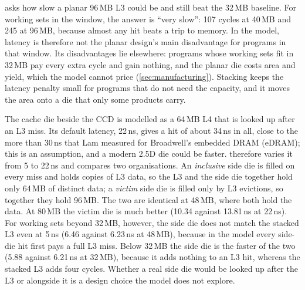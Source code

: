 

 asks how slow a planar 96\,MB L3 could be and still beat the 32\,MB baseline. For working sets in the window, the answer is ``very slow'': 107 cycles at 40\,MB and 245 at 96\,MB, because almost any hit beats a trip to memory. In the model, latency is therefore not the planar design's main disadvantage for programs in that window. Its disadvantages lie elsewhere: programs whose working sets fit in 32\,MB pay every extra cycle and gain nothing, and the planar die costs area and yield, which the model cannot price (\cref{sec:manufacturing}). Stacking keeps the latency penalty small for programs that do not need the capacity, and it moves the area onto a die that only some products carry.



The cache die beside the CCD is modelled as a 64\,MB L4 that is looked up after an L3 miss. Its default latency, 22\,ns, gives a hit of about 34\,ns in all, close to the more than 30\,ns that Lam measured for Broadwell's embedded DRAM (eDRAM); this is an assumption, and a modern 2.5D die could be faster.  therefore varies it from 5 to 22\,ns and compares two organisations. An \emph{inclusive} side die is filled on every miss and holds copies of L3 data, so the L3 and the side die together hold only 64\,MB of distinct data; a \emph{victim} side die is filled only by L3 evictions, so together they hold 96\,MB. The two are identical at 48\,MB, where both hold the data. At 80\,MB the victim die is much better (10.34 against 13.81\,ns at 22\,ns). For working sets beyond 32\,MB, however, the side die does not match the stacked L3 even at 5\,ns (6.46 against 6.23\,ns at 48\,MB), because in the model every side-die hit first pays a full L3 miss. Below 32\,MB the side die is the faster of the two (5.88 against 6.21\,ns at 32\,MB), because it adds nothing to an L3 hit, whereas the stacked L3 adds four cycles. Whether a real side die would be looked up after the L3 or alongside it is a design choice the model does not explore.



